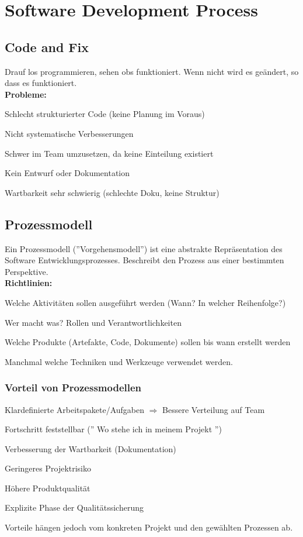 \chapter{Software Development Process}

\section{Code and Fix}
Drauf los programmieren, sehen obs funktioniert. Wenn nicht wird es geändert,
so dass es funktioniert. \\

\textbf{Probleme:}
\begin{compactitem}
    \item Schlecht strukturierter Code (keine Planung im Voraus)
    \item Nicht systematische Verbesserungen
    \item Schwer im Team umzusetzen, da keine Einteilung existiert
    \item Kein Entwurf oder Dokumentation
    \item Wartbarkeit sehr schwierig (schlechte Doku, keine Struktur)
\end{compactitem}

\section{Prozessmodell}
Ein Prozessmodell (''Vorgehensmodell'') ist eine abstrakte Repräsentation
des Software Entwicklungsprozesses. Beschreibt den Prozess aus einer bestimmten
Perspektive.\\

\textbf{Richtlinien:}
\begin{compactitem}
    \item Welche Aktivitäten sollen ausgeführt werden (Wann? In welcher
    Reihenfolge?)
    \item Wer macht was? Rollen und Verantwortlichkeiten
    \item Welche Produkte (Artefakte, Code, Dokumente) sollen bis wann erstellt
    werden
    \item Manchmal welche Techniken und Werkzeuge verwendet werden.
\end{compactitem}
\subsection{Vorteil von Prozessmodellen}
\begin{compactitem}
    \item Klardefinierte Arbeitspakete/Aufgaben $\Rightarrow$ Bessere Verteilung
    auf Team
    \item Fortschritt feststellbar ('' Wo stehe ich in meinem Projekt '')
    \item Verbesserung der Wartbarkeit (Dokumentation)
    \item Geringeres Projektrisiko
    \item Höhere Produktqualität
    \item Explizite Phase der Qualitätssicherung
\end{compactitem}
Vorteile hängen jedoch vom konkreten Projekt und den gewählten Prozessen ab.


